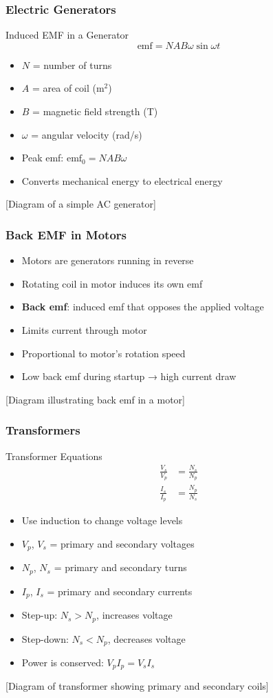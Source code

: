 \documentclass{beamer}
\begin{document}
\begin{frame}
\frametitle{Electric Generators}
\begin{block}{Induced EMF in a Generator}
\begin{equation}
\text{emf} = NAB\omega\sin\omega t
\end{equation}
\end{block}
\begin{itemize}
    \item $N$ = number of turns
    \item $A$ = area of coil (m$^2$)
    \item $B$ = magnetic field strength (T)
    \item $\omega$ = angular velocity (rad/s)
    \item Peak emf: $\text{emf}_0 = NAB\omega$
    \item Converts mechanical energy to electrical energy
\end{itemize}
\alert{[Diagram of a simple AC generator]}
\end{frame}

\begin{frame}
\frametitle{Back EMF in Motors}
\begin{itemize}
    \item Motors are generators running in reverse
    \item Rotating coil in motor induces its own emf
    \item \textbf{Back emf}: induced emf that opposes the applied voltage
    \item Limits current through motor
    \item Proportional to motor's rotation speed
    \item Low back emf during startup → high current draw
\end{itemize}
\alert{[Diagram illustrating back emf in a motor]}
\end{frame}

\begin{frame}
\frametitle{Transformers}
\begin{block}{Transformer Equations}
\begin{align}
\frac{V_s}{V_p} &= \frac{N_s}{N_p} \\
\frac{I_s}{I_p} &= \frac{N_p}{N_s}
\end{align}
\end{block}
\begin{itemize}
    \item Use induction to change voltage levels
    \item $V_p$, $V_s$ = primary and secondary voltages
    \item $N_p$, $N_s$ = primary and secondary turns
    \item $I_p$, $I_s$ = primary and secondary currents
    \item Step-up: $N_s > N_p$, increases voltage
    \item Step-down: $N_s < N_p$, decreases voltage
    \item Power is conserved: $V_pI_p = V_sI_s$
\end{itemize}
\alert{[Diagram of transformer showing primary and secondary coils]}
\end{frame}
\end{document}
